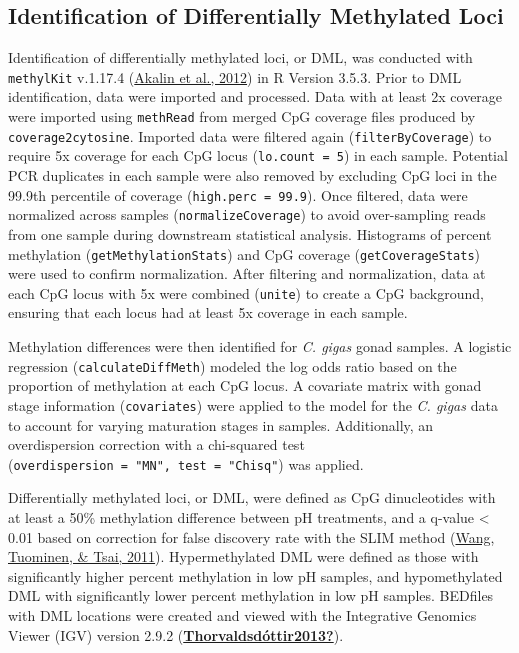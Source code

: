 \documentclass [11pt, proquest] {uwthesis}[2015/03/03]
\begin{document}
\hypertarget{identification-of-differentially-methylated-loci}{%
\subsection{Identification of Differentially Methylated Loci}\label{identification-of-differentially-methylated-loci}}

Identification of differentially methylated loci, or DML, was conducted with \texttt{methylKit} v.1.17.4 (\protect\hyperlink{ref-Akalin2012}{Akalin et al., 2012}) in R Version 3.5.3. Prior to DML identification, data were imported and processed. Data with at least 2x coverage were imported using \texttt{methRead} from merged CpG coverage files produced by \texttt{coverage2cytosine}. Imported data were filtered again (\texttt{filterByCoverage}) to require 5x coverage for each CpG locus (\texttt{lo.count\ =\ 5}) in each sample. Potential PCR duplicates in each sample were also removed by excluding CpG loci in the 99.9th percentile of coverage (\texttt{high.perc\ =\ 99.9}). Once filtered, data were normalized across samples (\texttt{normalizeCoverage}) to avoid over-sampling reads from one sample during downstream statistical analysis. Histograms of percent methylation (\texttt{getMethylationStats}) and CpG coverage (\texttt{getCoverageStats}) were used to confirm normalization. After filtering and normalization, data at each CpG locus with 5x were combined (\texttt{unite}) to create a CpG background, ensuring that each locus had at least 5x coverage in each sample.

Methylation differences were then identified for \emph{C. gigas} gonad samples. A logistic regression (\texttt{calculateDiffMeth}) modeled the log odds ratio based on the proportion of methylation at each CpG locus. A covariate matrix with gonad stage information (\texttt{covariates}) were applied to the model for the \emph{C. gigas} data to account for varying maturation stages in samples. Additionally, an overdispersion correction with a chi-squared test (\texttt{overdispersion\ =\ "MN",\ test\ =\ "Chisq"}) was applied.

Differentially methylated loci, or DML, were defined as CpG dinucleotides with at least a 50\% methylation difference between pH treatments, and a q-value \textless{} 0.01 based on correction for false discovery rate with the SLIM method (\protect\hyperlink{ref-Wang2011}{Wang, Tuominen, \& Tsai, 2011}). Hypermethylated DML were defined as those with significantly higher percent methylation in low pH samples, and hypomethylated DML with significantly lower percent methylation in low pH samples. BEDfiles with DML locations were created and viewed with the Integrative Genomics Viewer (IGV) version 2.9.2 (\protect\hyperlink{ref-Thorvaldsduxf3ttir2013}{\textbf{Thorvaldsdóttir2013?}}).
\end{document}
